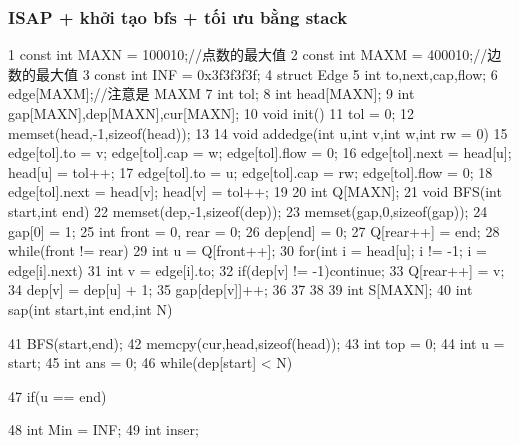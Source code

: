 \documentclass[11pt]{article}
\begin{document}
\subsubsection{ISAP + khởi tạo bfs + tối ưu bằng stack}

\begin{Code}
 1   const int MAXN = 100010;//点数的最大值
 2   const int MAXM = 400010;//边数的最大值
 3   const int INF = 0x3f3f3f3f;
 4   struct Edge{
 5       int to,next,cap,flow;
 6   }edge[MAXM];//注意是 MAXM
 7   int tol;
 8   int head[MAXN];
 9   int gap[MAXN],dep[MAXN],cur[MAXN];
10   void init(){
11       tol = 0;
12       memset(head,-1,sizeof(head));
13   }
14   void addedge(int u,int v,int w,int rw = 0){
15       edge[tol].to = v; edge[tol].cap = w; edge[tol].flow = 0;
16       edge[tol].next = head[u]; head[u] = tol++;
17       edge[tol].to = u; edge[tol].cap = rw; edge[tol].flow = 0;
18       edge[tol].next = head[v]; head[v] = tol++;
19   }
20   int Q[MAXN];
21   void BFS(int start,int end){
22       memset(dep,-1,sizeof(dep));
23       memset(gap,0,sizeof(gap));
24       gap[0] = 1;
25       int front = 0, rear = 0;
26       dep[end] = 0;
27       Q[rear++] = end;
28       while(front != rear){
29           int u = Q[front++];
30           for(int i = head[u]; i != -1; i = edge[i].next){
31                int v = edge[i].to;
32                if(dep[v] != -1)continue;
33                Q[rear++] = v;
34                dep[v] = dep[u] + 1;
35                gap[dep[v]]++;
36           }
37       }
38   }
39   int S[MAXN];
40   int sap(int start,int end,int N){
41       BFS(start,end);
42       memcpy(cur,head,sizeof(head));
43       int top = 0;
44       int u = start;
45       int ans = 0;
46       while(dep[start] < N){
47           if(u == end){
48                int Min = INF;
49                int inser;


}}}
\end{Code}
\end{document}
